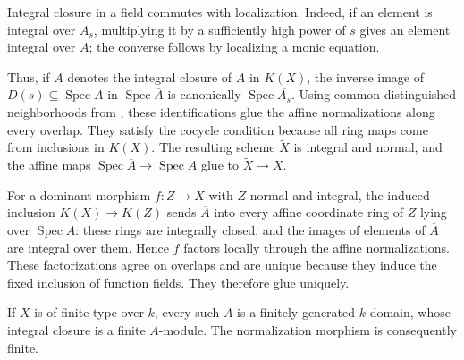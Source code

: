 Integral closure in a field commutes with localization. Indeed, if an element is integral over $A_s$, multiplying it by a sufficiently high power of $s$ gives an element integral over $A$; the converse follows by localizing a monic equation.

Thus, if $\overline A$ denotes the integral closure of $A$ in $K(X)$, the inverse image of $D(s)\subseteq\operatorname{Spec}A$ in $\operatorname{Spec}\overline A$ is canonically $\operatorname{Spec}\overline{A_s}$. Using common distinguished neighborhoods from , these identifications glue the affine normalizations along every overlap. They satisfy the cocycle condition because all ring maps come from inclusions in $K(X)$. The resulting scheme $\widetilde X$ is integral and normal, and the affine maps $\operatorname{Spec}\overline A\to\operatorname{Spec}A$ glue to $\widetilde X\to X$.

For a dominant morphism $f:Z\to X$ with $Z$ normal and integral, the induced inclusion $K(X)\to K(Z)$ sends $\overline A$ into every affine coordinate ring of $Z$ lying over $\operatorname{Spec}A$: these rings are integrally closed, and the images of elements of $\overline A$ are integral over them. Hence $f$ factors locally through the affine normalizations. These factorizations agree on overlaps and are unique because they induce the fixed inclusion of function fields. They therefore glue uniquely.

If $X$ is of finite type over $k$, every such $A$ is a finitely generated $k$-domain, whose integral closure is a finite $A$-module. The normalization morphism is consequently finite.
